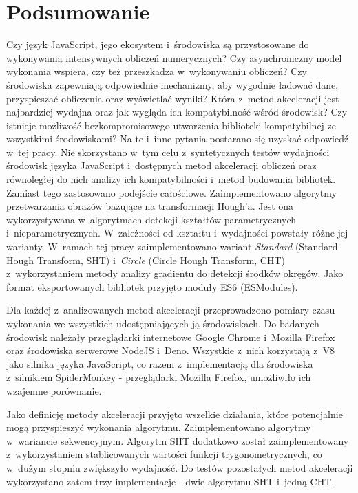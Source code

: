 \chapter{Podsumowanie}

Czy język JavaScript, jego ekosystem i~środowiska są przystosowane do wykonywania intensywnych obliczeń numerycznych? Czy asynchroniczny model wykonania wspiera, czy też przeszkadza w~wykonywaniu obliczeń? Czy środowiska zapewniają odpowiednie mechanizmy, aby wygodnie ładować dane, przyspieszać obliczenia oraz wyświetlać wyniki? Która z~metod akceleracji jest najbardziej wydajna oraz jak wygląda ich kompatybilność wśród środowisk? Czy istnieje możliwość bezkompromisowego utworzenia biblioteki kompatybilnej ze wszystkimi środowiskami? Na te i~inne pytania postarano się uzyskać odpowiedź w~tej pracy. Nie skorzystano w~tym celu z~syntetycznych testów wydajności środowisk języka JavaScript i~dostępnych metod akceleracji obliczeń oraz równoległej do nich analizy ich kompatybilności i~metod budowania bibliotek. Zamiast tego zastosowano podejście całościowe. Zaimplementowano algorytmy przetwarzania obrazów bazujące na transformacji Hough'a. Jest ona wykorzystywana w~algorytmach detekcji kształtów parametrycznych i~nieparametrycznych. W~zależności od kształtu i~wydajności powstały różne jej warianty. W~ramach tej pracy zaimplementowano wariant \textit{Standard} (Standard Hough Transform, SHT) i~\textit{Circle} (Circle Hough Transform, CHT) z~wykorzystaniem metody analizy gradientu do detekcji środków okręgów. Jako format eksportowanych bibliotek przyjęto moduły ES6 (ESModules).

Dla każdej z~analizowanych metod akceleracji przeprowadzono pomiary czasu wykonania we wszystkich udostępniających ją środowiskach. Do badanych środowisk należały przeglądarki internetowe Google Chrome i~Mozilla Firefox oraz środowiska serwerowe NodeJS i~Deno. Wszystkie z~nich korzystają z~V8 jako silnika języka JavaScript, co razem z~implementacją dla środowiska z~silnikiem SpiderMonkey - przeglądarki Mozilla Firefox, umożliwiło ich wzajemne porównanie. 

Jako definicję metody akceleracji przyjęto wszelkie działania, które potencjalnie mogą przyspieszyć wykonania algorytmu. Zaimplementowano algorytmy w~wariancie sekwencyjnym. Algorytm SHT dodatkowo został zaimplementowany z~wykorzystaniem stablicowanych wartości funkcji trygonometrycznych, co w~dużym stopniu zwiększyło wydajność. Do testów pozostałych metod akceleracji wykorzystano zatem trzy implementacje - dwie algorytmu SHT i~jedną CHT.

